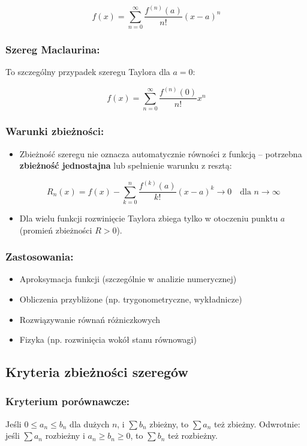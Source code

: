 $$
f(x) = \sum_{n=0}^{\infty} \frac{f^{(n)}(a)}{n!}(x - a)^n
$$

\subsubsection*{Szereg Maclaurina:}
To szczególny przypadek szeregu Taylora dla $a = 0$:

$$
f(x) = \sum_{n=0}^{\infty} \frac{f^{(n)}(0)}{n!}x^n
$$

\subsubsection*{Warunki zbieżności:}
\begin{itemize}
    \item Zbieżność szeregu nie oznacza automatycznie równości z funkcją -- potrzebna \textbf{zbieżność jednostajna} lub spełnienie warunku z resztą:

  $$
  R_n(x) = f(x) - \sum_{k=0}^n \frac{f^{(k)}(a)}{k!}(x - a)^k \to 0 \quad \text{dla } n \to \infty
  $$
    \item Dla wielu funkcji rozwinięcie Taylora zbiega tylko w otoczeniu punktu $a$ (promień zbieżności $R > 0$).
\end{itemize}

\subsubsection*{Zastosowania:}
\begin{itemize}
    \item Aproksymacja funkcji (szczególnie w analizie numerycznej)
    \item Obliczenia przybliżone (np. trygonometryczne, wykładnicze)
    \item Rozwiązywanie równań różniczkowych
    \item Fizyka (np. rozwinięcia wokół stanu równowagi)
\end{itemize}

\subsection{Kryteria zbieżności szeregów}

\subsubsection*{Kryterium porównawcze:}
Jeśli $0 \leq a_n \leq b_n$ dla dużych $n$, i $\sum b_n$ zbieżny, to $\sum a_n$ też zbieżny.
Odwrotnie: jeśli $\sum a_n$ rozbieżny i $a_n \geq b_n \geq 0$, to $\sum b_n$ też rozbieżny.

